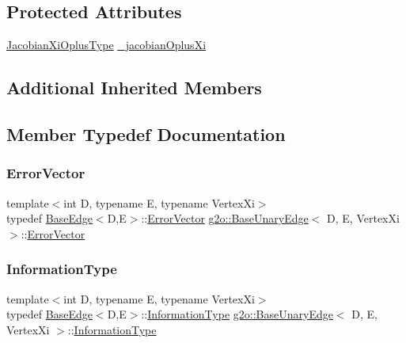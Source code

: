 \subsection*{Protected Attributes}
\begin{DoxyCompactItemize}
\item 
\mbox{\hyperlink{classg2o_1_1_base_unary_edge_a24bcabd661223e15b7337f2835310f5e}{Jacobian\+Xi\+Oplus\+Type}} \mbox{\hyperlink{classg2o_1_1_base_unary_edge_af7d022a6c6c9c29dfd9147fce0dc13d8}{\+\_\+jacobian\+Oplus\+Xi}}
\end{DoxyCompactItemize}
\subsection*{Additional Inherited Members}


\subsection{Member Typedef Documentation}
\mbox{\label{classg2o_1_1_base_unary_edge_abc04cfacb65fc72825156f1b3346dd48}} 
\subsubsection{\texorpdfstring{Error\+Vector}{ErrorVector}}
{\footnotesize\ttfamily template$<$int D, typename E, typename Vertex\+Xi$>$ \\
typedef \mbox{\hyperlink{classg2o_1_1_base_edge}{Base\+Edge}}$<$D,E$>$\+::\mbox{\hyperlink{classg2o_1_1_base_edge_af5b558dd24e4be2e437563cae4b3550d}{Error\+Vector}} \mbox{\hyperlink{classg2o_1_1_base_unary_edge}{g2o\+::\+Base\+Unary\+Edge}}$<$ D, E, Vertex\+Xi $>$\+::\mbox{\hyperlink{classg2o_1_1_base_edge_af5b558dd24e4be2e437563cae4b3550d}{Error\+Vector}}}

\mbox{\label{classg2o_1_1_base_unary_edge_a6753caa95c30fa5bb3887e2a30892ff3}} 
\subsubsection{\texorpdfstring{Information\+Type}{InformationType}}
{\footnotesize\ttfamily template$<$int D, typename E, typename Vertex\+Xi$>$ \\
typedef \mbox{\hyperlink{classg2o_1_1_base_edge}{Base\+Edge}}$<$D,E$>$\+::\mbox{\hyperlink{classg2o_1_1_base_edge_a2e5a33343ac3f189d8a7d5ee4d8b73fc}{Information\+Type}} \mbox{\hyperlink{classg2o_1_1_base_unary_edge}{g2o\+::\+Base\+Unary\+Edge}}$<$ D, E, Vertex\+Xi $>$\+::\mbox{\hyperlink{classg2o_1_1_base_edge_a2e5a33343ac3f189d8a7d5ee4d8b73fc}{Information\+Type}}}

